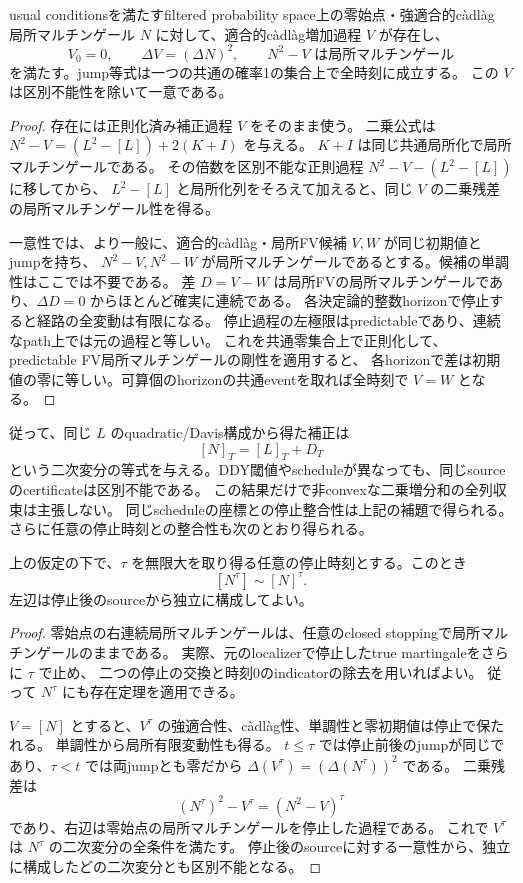 \begin{theorem}[元の局所マルチンゲールの二次変分]
usual conditionsを満たすfiltered probability space上の零始点・強適合的c\`adl\`ag
局所マルチンゲール $N$ に対して、適合的c\`adl\`ag増加過程 $V$ が存在し、
\[
 V_0=0,\qquad \Delta V=(\Delta N)^2,\qquad N^2-V\text{ は局所マルチンゲール}
\]
を満たす。jump等式は一つの共通の確率1の集合上で全時刻に成立する。
この $V$ は区別不能性を除いて一意である。
\end{theorem}
\begin{proof}
存在には正則化済み補正過程 $V$ をそのまま使う。
二乗公式は $N^2-V=(L^2-[L])+2(K+I)$ を与える。
$K+I$ は同じ共通局所化で局所マルチンゲールである。
その倍数を区別不能な正則過程 $N^2-V-(L^2-[L])$ に移してから、
 $L^2-[L]$ と局所化列をそろえて加えると、同じ $V$ の二乗残差の局所マルチンゲール性を得る。

一意性では、より一般に、適合的c\`adl\`ag・局所FV候補 $V,W$ が同じ初期値とjumpを持ち、
$N^2-V,N^2-W$ が局所マルチンゲールであるとする。候補の単調性はここでは不要である。
差 $D=V-W$ は局所FVの局所マルチンゲールであり、$\Delta D=0$ からほとんど確実に連続である。
各決定論的整数horizonで停止すると経路の全変動は有限になる。
停止過程の左極限はpredictableであり、連続なpath上では元の過程と等しい。
これを共通零集合上で正則化して、predictable FV局所マルチンゲールの剛性を適用すると、
各horizonで差は初期値の零に等しい。可算個のhorizonの共通eventを取れば全時刻で $V=W$ となる。
\end{proof}

従って、同じ $L$ のquadratic/Davis構成から得た補正は
\[
 [N]_T=[L]_T+D_T
\]
という二次変分の等式を与える。DDY閾値やscheduleが異なっても、同じsourceのcertificateは区別不能である。
この結果だけで非convexな二乗増分和の全列収束は主張しない。
同じscheduleの座標との停止整合性は上記の補題で得られる。
さらに任意の停止時刻との整合性も次のとおり得られる。

\begin{lemma}[二次変分の停止整合性]
上の仮定の下で、$\tau$ を無限大を取り得る任意の停止時刻とする。このとき
\[
 [N^\tau]\sim[N]^\tau.
\]
左辺は停止後のsourceから独立に構成してよい。
\end{lemma}
\begin{proof}
零始点の右連続局所マルチンゲールは、任意のclosed stoppingで局所マルチンゲールのままである。
実際、元のlocalizerで停止したtrue martingaleをさらに $\tau$ で止め、
二つの停止の交換と時刻0のindicatorの除去を用いればよい。
従って $N^\tau$ にも存在定理を適用できる。

$V=[N]$ とすると、$V^\tau$ の強適合性、c\`adl\`ag性、単調性と零初期値は停止で保たれる。
単調性から局所有限変動性も得る。
$t\le\tau$ では停止前後のjumpが同じであり、$\tau<t$ では両jumpとも零だから
$\Delta(V^\tau)=(\Delta(N^\tau))^2$ である。
二乗残差は
\[
 (N^\tau)^2-V^\tau=(N^2-V)^\tau
\]
であり、右辺は零始点の局所マルチンゲールを停止した過程である。
これで $V^\tau$ は $N^\tau$ の二次変分の全条件を満たす。
停止後のsourceに対する一意性から、独立に構成したどの二次変分とも区別不能となる。
\end{proof}


